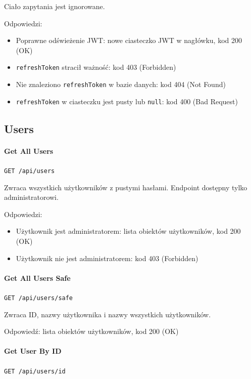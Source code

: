 \documentclass[a4paper,twoside,12pt]{book}
\begin{document}
Ciało zapytania jest ignorowane.

Odpowiedzi: 
\begin{itemize}
	\item Poprawne odświeżenie JWT: nowe ciasteczko JWT w nagłówku, kod 200 (OK) 
	\item \texttt{refreshToken} stracił ważność: kod 403 (Forbidden) 
	\item Nie znaleziono \texttt{refreshToken} w bazie danych: kod 404 (Not Found)
	\item \texttt{refreshToken} w ciasteczku jest pusty lub \texttt{null}: kod 400 (Bad Request)
\end{itemize}


\subsection{Users}

\paragraph{Get All Users}

\texttt{GET /api/users}

Zwraca wszystkich użytkowników z pustymi hasłami. Endpoint dostępny tylko administratorowi.

Odpowiedzi: 
\begin{itemize}
	\item Użytkownik jest administratorem: lista obiektów użytkowników, kod 200 (OK) 
	\item Użytkownik nie jest administratorem: kod 403 (Forbidden)
\end{itemize}

\paragraph{Get All Users Safe}

\texttt{GET /api/users/safe}

Zwraca ID, nazwy użytkownika i nazwy wszystkich użytkowników.

Odpowiedź: lista obiektów użytkowników, kod 200 (OK)

\paragraph{Get User By ID}

\texttt{GET /api/users/{id}}
\end{document}
